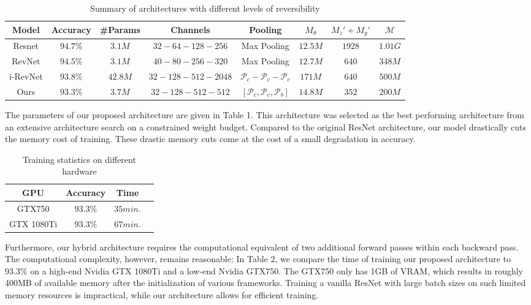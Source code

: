 \documentclass[twocolumn]{bmcart}
\begin{document}
\begin{table*}[t]
\begin{tabular}{ c c c c c c c c}	
Model     & Accuracy & \#Params & Channels & Pooling  & $M_{\theta}$ & $M_{z}'+M_{g}'$ & $\mathcal{M} $ \\
\hline
Resnet    & $94.7\%$   & $3.1M$   &  $32 - 64 - 128  - 256$       & Max Pooling      				           &  $12.5M$   &  $1928$  & $1.01G$  \\			
RevNet    & $94.5\%$   & $3.1M$   &  $40 - 80 - 256  - 320$       & Max Pooling      				           &  $12.7M$   &  $640$   & $348M$   \\
i-RevNet  & $93.8\%$   & $42.8M$  &  $32 - 128 - 512 - 2048$      & $\mathcal{P}_c - \mathcal{P}_c - \mathcal{P}_c$          &  $171M$    &  $640$   & $500M$   \\
Ours      & $93.3\%$   & $3.7M$   &  $32 - 128 - 512 - 512$       & $[\mathcal{P}_c, \mathcal{P}_c, \mathcal{P}_b]$          &  $14.8M$   &  $352$   & $200M$   \\
\hline
\end{tabular}
\begin{center}
\caption{Summary of architectures with different levels of reversibility}
\end{center}
\end{table*}

The parameters of our proposed architecture are given in Table 1.
This architecture was selected as the best performing architecture 
from an extensive architecture search on a constrained weight budget. 
Compared to the original ResNet architecture, our model drastically cuts the memory cost of training.
These drastic memory cuts come at the cost of a small degradation in accuracy.

\begin{table}[h]
\centering
\begin{tabular}{ c c c c}	
 GPU & Accuracy  & Time \\
\hline			
GTX750     & $93.3\%$  & $35 min.$    \\
GTX 1080Ti & $93.3\%$  & $67 min.$  \\
\hline
\end{tabular}
\caption{Training statistics on different hardware}
\end{table}

Furthermore, our hybrid architecture requires the computational equivalent of two additional forward passes within each backward pass.
The computational complexity, however, remains reasonable:
In Table 2, we compare the time of training our proposed architecture to 93.3\% on a high-end Nvidia GTX 1080Ti and a low-end
Nvidia GTX750.
The GTX750 only has 1GB of VRAM, which results in roughly 400MB of available memory after the initialization of various frameworks.
Training a vanilla ResNet with large batch sizes on such limited memory resources is impractical, while our architecture allows for efficient training. 
\end{document}
